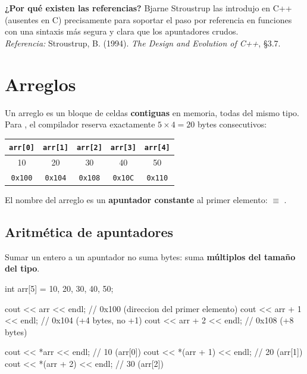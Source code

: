 \documentclass[12pt, oneside]{article}
\begin{document}
\begin{tecnico}
  \textbf{¿Por qué existen las referencias?} Bjarne Stroustrup las introdujo
  en C++ (ausentes en C) precisamente para soportar el paso por referencia en
  funciones con una sintaxis más segura y clara que los apuntadores crudos.\\
  \textit{Referencia:} Stroustrup, B. (1994). \textit{The Design and Evolution
  of C++}, §3.7.
\end{tecnico}

\section{Arreglos}

Un arreglo es un bloque de celdas \textbf{contiguas} en memoria, todas del
mismo tipo. Para , el compilador reserva exactamente $5 \times
4 = 20$ bytes consecutivos:

\begin{center}
\begin{tabular}{ccccc}
  \toprule
  \texttt{arr[0]} & \texttt{arr[1]} & \texttt{arr[2]} & \texttt{arr[3]} & \texttt{arr[4]} \\
  \midrule
  10 & 20 & 30 & 40 & 50 \\
  \texttt{0x100} & \texttt{0x104} & \texttt{0x108} & \texttt{0x10C} & \texttt{0x110} \\
  \bottomrule
\end{tabular}
\end{center}

El nombre del arreglo es un \textbf{apuntador constante} al primer elemento:
 $\equiv$ .

\subsection{Aritmética de apuntadores}

Sumar un entero a un apuntador no suma bytes: suma \textbf{múltiplos del
tamaño del tipo}.

\begin{codigo}[caption={Aritmetica de apuntadores}]
int arr[5] = {10, 20, 30, 40, 50};

cout << arr     << endl;  // 0x100  (direccion del primer elemento)
cout << arr + 1 << endl;  // 0x104  (+4 bytes, no +1)
cout << arr + 2 << endl;  // 0x108  (+8 bytes)

cout << *arr       << endl;  // 10  (arr[0])
cout << *(arr + 1) << endl;  // 20  (arr[1])
cout << *(arr + 2) << endl;  // 30  (arr[2])
\end{codigo}
\end{document}
